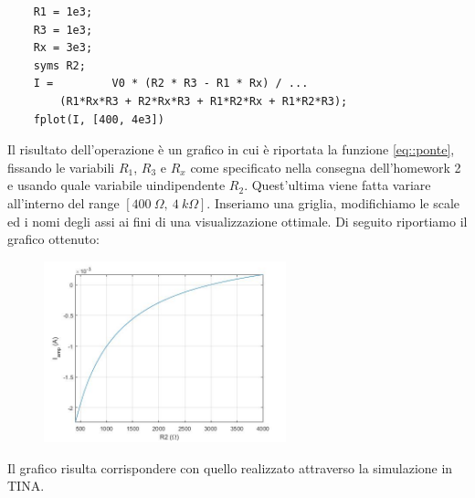\begin{verbatim}
    R1 = 1e3;
    R3 = 1e3;
    Rx = 3e3;
    syms R2;
    I =         V0 * (R2 * R3 - R1 * Rx) / ...
        (R1*Rx*R3 + R2*Rx*R3 + R1*R2*Rx + R1*R2*R3);
    fplot(I, [400, 4e3])
\end{verbatim}

Il risultato dell'operazione è un grafico in cui è riportata la funzione \ref{eq::ponte}, fissando le variabili $R_1$, $R_3$ e $R_x$ come specificato nella consegna dell'homework 2 e usando quale variabile uindipendente $R_2$. Quest'ultima viene fatta variare all'interno del range $[400 \: \Omega, \: 4 \: k\Omega]$. Inseriamo una griglia, modifichiamo le scale ed i nomi degli assi ai fini di una visualizzazione ottimale. Di seguito riportiamo il grafico ottenuto:
\begin{figure}[H]
\caption{}
    \includegraphics[width=7cm]{settimana_2/immagini/diagramma_r2_matlab.jpg}
    \centering
\end{figure}
Il grafico risulta corrispondere con quello realizzato attraverso la simulazione in TINA.

